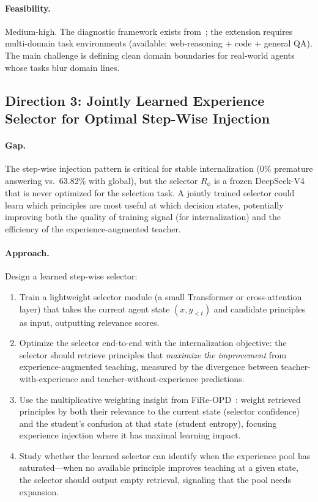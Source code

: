 \documentclass[11pt,a4paper]{article}
\begin{document}
\paragraph{Feasibility.} Medium-high. The diagnostic framework exists from~\cite{yang2026perturbation}; the extension requires multi-domain task environments (available: web-reasoning + code + general QA). The main challenge is defining clean domain boundaries for real-world agents whose tasks blur domain lines.

\subsection{Direction 3: Jointly Learned Experience Selector for Optimal Step-Wise Injection}

\paragraph{Gap.} The step-wise injection pattern is critical for stable internalization (0\% premature answering vs.\ 63.82\% with global), but the selector $R_\phi$ is a frozen DeepSeek-V4 that is never optimized for the selection task. A jointly trained selector could learn which principles are most useful at which decision states, potentially improving both the quality of training signal (for internalization) and the efficiency of the experience-augmented teacher.

\paragraph{Approach.} Design a learned step-wise selector:
\begin{enumerate}
\item Train a lightweight selector module (a small Transformer or cross-attention layer) that takes the current agent state $(x, y_{<t})$ and candidate principles as input, outputting relevance scores.
\item Optimize the selector end-to-end with the internalization objective: the selector should retrieve principles that \emph{maximize the improvement} from experience-augmented teaching, measured by the divergence between teacher-with-experience and teacher-without-experience predictions.
\item Use the multiplicative weighting insight from FiRe-OPD~\cite{fire2026}: weight retrieved principles by both their relevance to the current state (selector confidence) and the student's confusion at that state (student entropy), focusing experience injection where it has maximal learning impact.
\item Study whether the learned selector can identify when the experience pool has saturated---when no available principle improves teaching at a given state, the selector should output empty retrieval, signaling that the pool needs expansion.
\end{enumerate}
\end{document}

